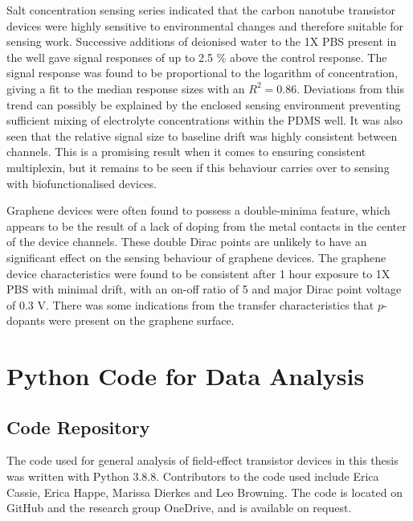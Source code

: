 \documentclass[
  a4paper,
]{scrbook}
\begin{document}
Salt concentration sensing series indicated that the carbon nanotube
transistor devices were highly sensitive to environmental changes and
therefore suitable for sensing work. Successive additions of deionised
water to the 1X PBS present in the well gave signal responses of up to
2.5 \% above the control response. The signal response was found to be
proportional to the logarithm of concentration, giving a fit to the
median response sizes with an \(R^2 = 0.86\). Deviations from this trend
can possibly be explained by the enclosed sensing environment preventing
sufficient mixing of electrolyte concentrations within the PDMS well. It
was also seen that the relative signal size to baseline drift was highly
consistent between channels. This is a promising result when it comes to
ensuring consistent multiplexin, but it remains to be seen if this
behaviour carries over to sensing with biofunctionalised devices.

Graphene devices were often found to possess a double-minima feature,
which appears to be the result of a lack of doping from the metal
contacts in the center of the device channels. These double Dirac points
are unlikely to have an significant effect on the sensing behaviour of
graphene devices. The graphene device characteristics were found to be
consistent after 1 hour exposure to 1X PBS with minimal drift, with an
on-off ratio of 5 and major Dirac point voltage of 0.3 V. There was some
indications from the transfer characteristics that \(p\)-dopants were
present on the graphene surface.

\cleardoublepage
{}
{}
\appendix

\hypertarget{sec-python}{%
\chapter{Python Code for Data Analysis}\label{sec-python}}

\hypertarget{code-repository}{%
\section{Code Repository}\label{code-repository}}

The code used for general analysis of field-effect transistor devices in
this thesis was written with Python 3.8.8. Contributors to the code used
include Erica Cassie, Erica Happe, Marissa Dierkes and Leo Browning. The
code is located on GitHub and the research group OneDrive, and is
available on request.
\end{document}
